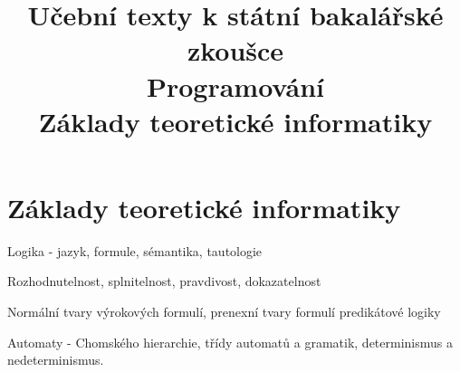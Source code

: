 \clearpage  \clearpage
\title{\LARGE Učební texty k státní bakalářské zkoušce \\ Programování \\ Základy teoretické informatiky}

\maketitle
\newpage
\setcounter{section}{0}
\section{Základy teoretické informatiky}
\begin{pozadavky}
\begin{pitemize}
\item Logika - jazyk, formule, sémantika, tautologie
\item Rozhodnutelnost, splnitelnost, pravdivost, dokazatelnost
\item Normální tvary výrokových formulí, prenexní tvary formulí predikátové logiky
\item Automaty - Chomského hierarchie, třídy automatů a gramatik, determinismus a nedeterminismus.
\end{pitemize}
\end{pozadavky}







